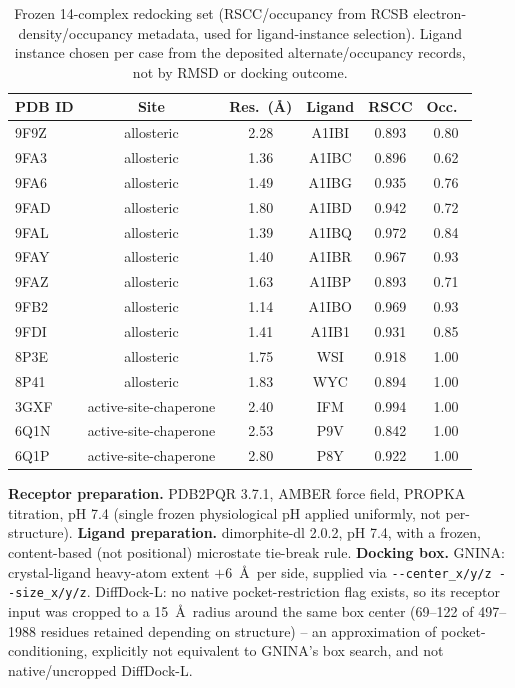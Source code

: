 \documentclass{article}
\begin{document}
\begin{table}[h]
\centering
\footnotesize
\begin{tabular}{lccccc}
\toprule
PDB ID & Site & Res.\ (\AA) & Ligand & RSCC & Occ.\ \\
\midrule
9F9Z & allosteric & 2.28 & A1IBI & 0.893 & 0.80 \\
9FA3 & allosteric & 1.36 & A1IBC & 0.896 & 0.62 \\
9FA6 & allosteric & 1.49 & A1IBG & 0.935 & 0.76 \\
9FAD & allosteric & 1.80 & A1IBD & 0.942 & 0.72 \\
9FAL & allosteric & 1.39 & A1IBQ & 0.972 & 0.84 \\
9FAY & allosteric & 1.40 & A1IBR & 0.967 & 0.93 \\
9FAZ & allosteric & 1.63 & A1IBP & 0.893 & 0.71 \\
9FB2 & allosteric & 1.14 & A1IBO & 0.969 & 0.93 \\
9FDI & allosteric & 1.41 & A1IB1 & 0.931 & 0.85 \\
8P3E & allosteric & 1.75 & WSI & 0.918 & 1.00 \\
8P41 & allosteric & 1.83 & WYC & 0.894 & 1.00 \\
3GXF & active-site-chaperone & 2.40 & IFM & 0.994 & 1.00 \\
6Q1N & active-site-chaperone & 2.53 & P9V & 0.842 & 1.00 \\
6Q1P & active-site-chaperone & 2.80 & P8Y & 0.922 & 1.00 \\
\bottomrule
\end{tabular}
\caption{Frozen 14-complex redocking set (RSCC/occupancy from RCSB electron-density/occupancy metadata, used for ligand-instance selection). Ligand instance chosen per case from the deposited alternate/occupancy records, not by RMSD or docking outcome.}
\end{table}

\textbf{Receptor preparation.} PDB2PQR 3.7.1, AMBER force field, PROPKA titration, pH 7.4 (single frozen physiological pH applied uniformly, not per-structure). \textbf{Ligand preparation.} dimorphite-dl 2.0.2, pH 7.4, with a frozen, content-based (not positional) microstate tie-break rule. \textbf{Docking box.} GNINA: crystal-ligand heavy-atom extent $+6$~\AA\ per side, supplied via \texttt{-{}-center\_x/y/z -{}-size\_x/y/z}. DiffDock-L: no native pocket-restriction flag exists, so its receptor input was cropped to a 15~\AA\ radius around the same box center (69--122 of 497--1988 residues retained depending on structure) -- an approximation of pocket-conditioning, explicitly not equivalent to GNINA's box search, and not native/uncropped DiffDock-L.
\end{document}
